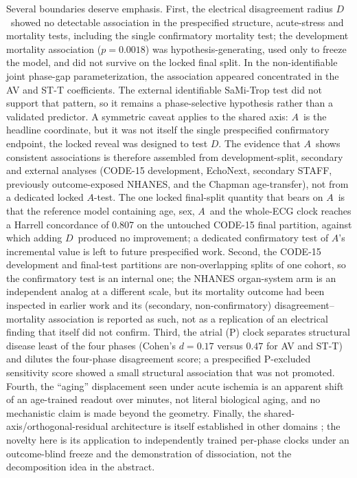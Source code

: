 \documentclass[11pt]{article}
\newcommand{\D}{\ensuremath{D}}
\newcommand{\A}{\ensuremath{A}}
\begin{document}
Several boundaries deserve emphasis. First, the electrical disagreement radius
\D\ showed no detectable association in the prespecified structure,
acute-stress and mortality tests, including the single confirmatory mortality
test; the development mortality association ($p=\num{0.0018}$) was
hypothesis-generating, used only to freeze the model, and did not survive on the locked
final split. In the non-identifiable joint phase-gap parameterization, the
association appeared concentrated in the AV and ST-T coefficients. The external
identifiable SaMi-Trop test did not support that pattern, so it remains a
phase-selective hypothesis rather than a validated predictor. A symmetric
caveat applies to the shared axis: \A\
is the headline coordinate, but it was not itself the single prespecified confirmatory
endpoint, the locked reveal was designed to test \D. The evidence that \A\ shows
consistent associations is
therefore assembled from development-split, secondary and external analyses (CODE-15
development, EchoNext, secondary STAFF, previously outcome-exposed NHANES, and the Chapman
age-transfer), not from a dedicated locked \A-test. The one locked final-split quantity
that bears on \A\ is that the reference model containing age, sex, \A\ and the whole-ECG
clock reaches a Harrell concordance of \num{0.807} on the untouched CODE-15 final partition,
against which adding \D\ produced no improvement; a dedicated confirmatory test of \A's
incremental value is left to future prespecified work. Second, the CODE-15 development and final-test
partitions are non-overlapping splits of one cohort, so the confirmatory test is an
internal one; the NHANES organ-system arm is an independent analog at a different scale,
but its mortality outcome had been inspected in earlier work and its (secondary,
non-confirmatory) disagreement--mortality association is reported as such, not as a
replication of an electrical finding that itself did not confirm. Third, the atrial (P)
clock separates structural disease least of the four phases (Cohen's $d=\num{0.17}$ versus
$\num{0.47}$ for AV and ST-T) and dilutes the four-phase disagreement score; a
prespecified P-excluded sensitivity score showed a small structural association that was
not promoted. Fourth, the ``aging'' displacement seen under acute ischemia is an
apparent shift of an age-trained readout over minutes, not literal biological aging, and
no mechanistic claim is made beyond the geometry. Finally, the shared-axis/orthogonal-residual
architecture is itself established in other domains \citep{disco2025,cohen2013}; the novelty here
is its application to independently trained per-phase clocks under an outcome-blind freeze
and the demonstration of dissociation, not the decomposition idea in the abstract.
\end{document}
